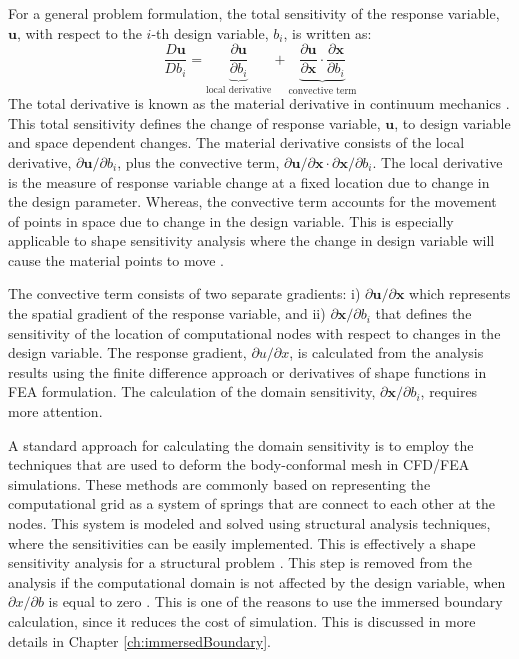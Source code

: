 For a general problem formulation, the total sensitivity of the response variable, $\mathbf{u}$, with respect to the $i$-th design variable, $b_i$, is written as:
%
\begin{equation}\label{eq:C2_totalSensitivityDef}
    \frac{D \mathbf{u}}{D b_i} = 
    \underbrace{\frac{\partial \mathbf{u}}{\partial b_i}}_\text{local derivative} + 
    \underbrace{\frac{\partial \mathbf{u}}{\partial \mathbf{x}} \cdot
    \frac{\partial \mathbf{x}}{\partial b_i}}_\text{convective term}
\end{equation}
%
The total derivative is known as the material derivative in continuum mechanics \cite{mase2009continuum}. This total sensitivity defines the change of response variable, $\mathbf{u}$, to design variable and space dependent changes. The material derivative consists of the local derivative, $\partial \mathbf{u}/\partial b_i$, plus the convective term, $\partial \mathbf{u}/\partial \mathbf{x} \cdot \partial \mathbf{x}/\partial b_i$. The local derivative is the measure of response variable change at a fixed location due to change in the design parameter. Whereas, the convective term accounts for the movement of points in space due to change in the design variable. This is especially applicable to shape sensitivity analysis where the change in design variable will cause the material points to move \cite{cross2014local}.

The convective term consists of two separate gradients: i) $\partial \mathbf{u} / \partial \mathbf{x}$ which represents the spatial gradient of the response variable, and ii) $\partial \mathbf{x} / \partial b_i$ that defines the sensitivity of the location of computational nodes with respect to changes in the design variable. The response gradient, $\partial u/\partial x$, is calculated from the analysis results using the finite difference approach or derivatives of shape functions in FEA formulation. The calculation of the domain sensitivity, $\partial \mathbf{x} / \partial b_i$, requires more attention.

A standard approach for calculating the domain sensitivity is to employ the techniques that are used to deform the body-conformal mesh in CFD/FEA simulations. These methods are commonly based on representing the computational grid as a system of springs that are connect to each other at the nodes. This system is modeled and solved using structural analysis techniques, where the sensitivities can be easily implemented. This is effectively a shape sensitivity analysis for a structural problem \cite{haftka1986structural}. This step is removed from the analysis if the computational domain is not affected by the design variable, when $\partial x/\partial b$ is equal to zero \cite{gobal2014continuum}. This is one of the reasons to use the immersed boundary calculation, since it reduces the cost of simulation. This is discussed in more details in Chapter \ref{ch:immersedBoundary}.

